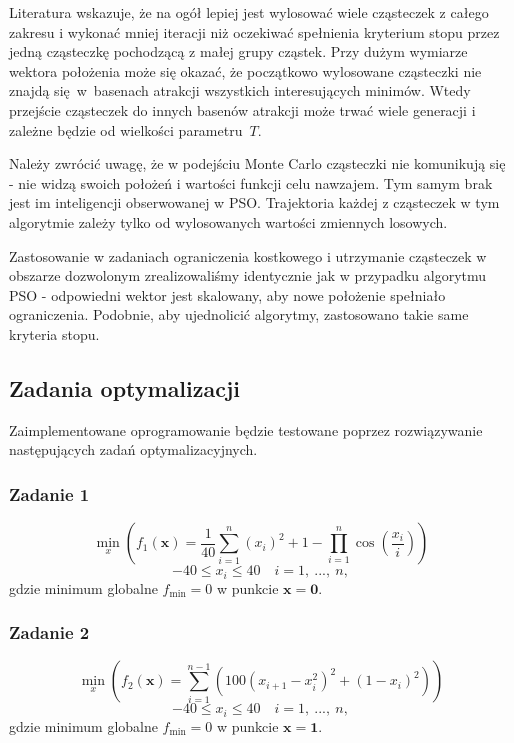 \documentclass[11pt, a4paper, oneside]{article}
\newcommand{\vect}[1]{\bm{\mathbf{#1}}}
\begin{document}
Literatura wskazuje, że na ogół lepiej jest wylosować wiele cząsteczek z całego zakresu i wykonać mniej iteracji niż oczekiwać spełnienia kryterium stopu przez jedną cząsteczkę pochodzącą z małej grupy cząstek. Przy dużym wymiarze wektora położenia może się okazać, że początkowo wylosowane cząsteczki nie znajdą się~w~basenach atrakcji wszystkich interesujących minimów. Wtedy przejście cząsteczek do innych basenów atrakcji może trwać wiele generacji i zależne będzie od wielkości parametru~$T$.

Należy zwrócić uwagę, że w podejściu Monte Carlo cząsteczki nie komunikują się - nie widzą swoich położeń i wartości funkcji celu nawzajem. Tym samym brak jest im inteligencji obserwowanej w PSO. Trajektoria każdej z cząsteczek w tym algorytmie zależy tylko od wylosowanych wartości zmiennych losowych.

Zastosowanie w zadaniach ograniczenia kostkowego i utrzymanie cząsteczek w obszarze dozwolonym zrealizowaliśmy identycznie jak w przypadku algorytmu PSO - odpowiedni wektor jest skalowany, aby nowe położenie spełniało ograniczenia. Podobnie, aby ujednolicić algorytmy, zastosowano takie same kryteria stopu.

\subsection{Zadania optymalizacji}
Zaimplementowane oprogramowanie będzie testowane poprzez rozwiązywanie następujących zadań optymalizacyjnych.
\subsubsection{Zadanie 1}
\begin{equation}
\min_{x} \left(f_{1}\left(\vect{x}\right) = \frac{1}{40} \sum_{i=1}^{n}\left(x_{i}\right)^{2} + 1 - \prod_{i =1}^{n} \cos\left(\frac{x_{i}}{i}\right)\right)
\end{equation}
\begin{equation}
-40 \leq x_{i} \leq 40 \quad i = 1, \ ..., \ n,
\end{equation}
gdzie minimum globalne $f_{\mathrm{min}} = 0$ w punkcie $\vect{x} = \vect{0}$.

\subsubsection{Zadanie 2}
\begin{equation}
\min_{x} \left(f_{2}\left(\vect{x}\right) = \sum_{i=1}^{n-1}\left(100\left(x_{i+1}-x_{i}^{2}\right)^{2} + \left(1-x_{i}\right)^{2} \right) \right)
\end{equation}
\begin{equation}
-40 \leq x_{i} \leq 40 \quad i = 1, \ ..., \ n,
\end{equation}
gdzie minimum globalne $f_{\mathrm{min}} = 0$ w punkcie $\vect{x} = \vect{1}$.
\end{document}

